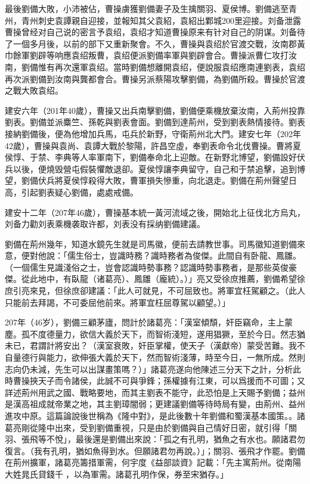 最後劉備大敗，小沛被佔，曹操虜獲劉備妻子及生擒關羽、夏侯博。劉備逃至青州，青州刺史袁譚親自迎接，並報知其父袁紹，袁紹出鄴城200里迎接。刘备泄露曹操曾经对自己说的密言予袁绍，袁绍才知道曹操原来有针对自己的阴谋。刘备待了一個多月後，以前的部下又重新聚會。不久，曹操與袁绍於官渡交戰，汝南郡黃巾餘軍劉辟等响應袁绍叛曹，袁绍便派劉備率軍與劉辟會合。曹操派曹仁攻打汝南，劉備惟有再次還軍袁绍。當時劉備想離開袁绍，便說服袁绍應南連劉表，袁绍再次派劉備到汝南與龔都會合。曹操另派蔡陽攻擊劉備，為劉備所殺。曹操於官渡之戰大敗袁绍。

建安六年（201年40歲），曹操又出兵南擊劉備，劉備便乘機放棄汝南，入荊州投靠劉表。劉備並派麋竺、孫乾與劉表會面。劉備到達荊州，受到劉表熱情接待。劉表接納劉備後，便為他增加兵馬，屯兵於新野，守衛荊州北大門。建安七年（202年42歲），曹操與袁尚、袁譚大戰於黎陽，許昌空虛，奉劉表命令北伐曹操。曹將夏侯惇、于禁、李典等人率軍南下，劉備奉命北上迎敵。在新野北博望，劉備設好伏兵以後，便燒毁營屯假裝懼敵退卻。夏侯惇讓李典留守，自己和于禁追擊，追到博望，劉備伏兵將夏侯惇殺得大敗，曹軍損失慘重，向北退走。劉備在荊州聲望日高，引起劉表疑心劉備，處處戒備。

建安十二年（207年46歲），曹操基本統一黃河流域之後，開始北上征伐北方烏丸，刘备力勸刘表乘機袭取许都，刘表没有採纳劉備建議。

劉備在荊州幾年，知道水鏡先生就是司馬徽，便前去請教世事。司馬徽知道劉備來意，便對他說：「儒生俗士，豈識時務？識時務者為俊傑。此間自有卧龍、鳳雛。（一個儒生見識淺俗之士，豈會認識時勢事務？認識時勢事務者，是那些英俊豪傑。從此地中，有臥龍（诸葛亮）、鳳雛（龐統）。）」亮又受徐庶推薦，劉備希望徐庶引亮來見，但徐庶卻建議：「此人可就見，不可屈致也。將軍宜枉駕顧之。（此人只能前去拜謁，不可委屈他前來。將軍宜枉屈尊駕以顧望。）」

207年（46岁），劉備三顧茅廬，問計於諸葛亮：「漢室傾頹，奸臣竊命，主上蒙塵。孤不度德量力，欲信大義於天下，而智術淺短，遂用猖獗，至於今日。然志猶未已，君謂計將安出？（漢室衰敗，奸臣掌權，使天子（漢獻帝）蒙受苦難。我不自量德行與能力，欲伸張大義於天下，然而智術淺薄，時至今日，一無所成。然則志向仍未減，先生可以出謀畫策嗎？）」諸葛亮遂向他陳述三分天下之計，分析此時曹操挾天子而令諸侯，此誠不可與爭鋒；孫權據有江東，可以爲援而不可圖；又詳述荊州用武之國、戰略要地，而其主劉表不能守，此恐怕是上天賜予劉備；益州是漢高祖成就帝業之地，其主劉璋闇弱；更建議劉備等待時局有變，由荊州、益州進攻中原。這篇論說後世稱為《隆中對》，是此後數十年劉備和蜀漢基本國策。。諸葛亮剛從隆中出來，受到劉備重視，只是由於劉備與自己情好日密，就引得「關羽、張飛等不悅」，最後還是劉備出來說：「孤之有孔明，猶魚之有水也。願諸君勿復言。（我有孔明，猶如魚得到水。但願諸君勿再說。）」；關羽、張飛才作罷。劉備在荊州擴軍，諸葛亮籌措軍需，何宇度《益部談資》記載：「先主寓荊州。從南陽大姓晁氏貸錢千𦻼，以為軍需。諸葛孔明作保，券至宋猶存。」

